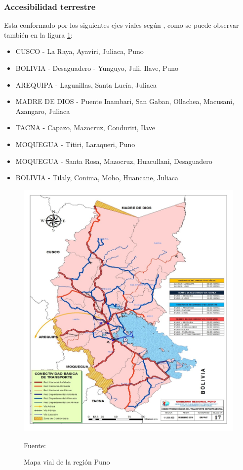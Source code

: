 \subsubsection{Accesibilidad terrestre}
Esta conformado por los siguientes ejes viales según , como se puede observar también en la figura \ref{fig:mapa_vial_puno}:
\begin{itemize}
    \item CUSCO - La Raya, Ayaviri, Juliaca, Puno
    \item BOLIVIA - Desaguadero - Yunguyo, Juli, Ilave, Puno
    \item AREQUIPA - Lagunillas, Santa Lucía, Juliaca
    \item MADRE DE DIOS - Puente Inambari, San Gaban, Ollachea, Macusani, Azangaro, Juliaca
    \item TACNA - Capazo, Mazocruz, Conduriri, Ilave
    \item MOQUEGUA - Titiri, Laraqueri, Puno
    \item MOQUEGUA - Santa Rosa, Mazocruz, Huacullani, Desaguadero
    \item BOLIVIA - Tilaly, Conima, Moho, Huancane, Juliaca
\end{itemize}
\begin{figure}[!ht]
    \centering
    \includegraphics[scale=1]{Capitulo4/Figs/mapa-vial-puno.jpg}
    \caption{Mapa vial de la región Puno}
    Fuente: 
    \label{fig:mapa_vial_puno}
\end{figure}

